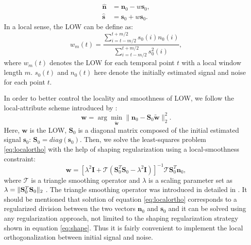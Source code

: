 \begin{align}
\label{eq:ortho1}
\hat{\mathbf{n}} &= \mathbf{n}_0 - w\mathbf{s}_0, \\
\label{eq:ortho2}
\hat{\mathbf{s}} &= \mathbf{s}_0 + w\mathbf{s}_0.
\end{align}
In a local sense, the LOW can be define as:
      \begin{equation}
        \label{eq:eq2}
          w_m(t) = \frac{\displaystyle\sum_{i=t-m/2}^{t+m/2} s_0(i) n_0(i)}{\displaystyle\sum_{i=t-m/2}^{t+m/2} s_0^2(i)},
      \end{equation}
where $w_m(t)$ denotes the LOW for each temporal point $t$ with a local window length $m$. $s_0(t)$ and $n_0(t)$ here denote the initially estimated signal and noise for each point $t$.

In order to better control the locality and smoothness of LOW, we follow the local-attribute scheme introduced by \cite{fomel2007localattr}: %
\begin{equation}
\label{eq:localortho}
\mathbf{w} = \arg\min_{\mathbf{\tilde{w}}} \parallel \mathbf{n}_0 - \mathbf{S}_0\mathbf{\tilde{w}}\parallel_2^2. %
\end{equation}
Here, $\mathbf{w}$ is the LOW, $\mathbf{S}_0$ is a diagonal matrix composed of the initial estimated signal $\mathbf{s}_0$: $\mathbf{S}_0=diag(\mathbf{s}_0)$.
Then, we solve the least-squares problem \ref{eq:localortho} with the help of shaping regularization using a local-smoothness constraint:
\begin{equation}
\label{eq:shape}
\mathbf{w} = [\lambda^2\mathbf{I} + \mathcal{T}(\mathbf{S}_0^T\mathbf{S}_0-\lambda^2\mathbf{I})]^{-1}\mathcal{T}\mathbf{S}_0^T\mathbf{n}_0,
\end{equation}
where $\mathcal{T}$ is a triangle smoothing operator and $\lambda$ is a scaling parameter set as $\lambda  = \Arrowvert\mathbf{S}_0^T\mathbf{S}_0\Arrowvert_2$ \cite{fomel2007localattr}. The triangle smoothing operator was introduced in detailed in \cite{fomel2007shape}. It should be mentioned that solution of equation \ref{eq:localortho} corresponds to a regularized division between the two vectors $\mathbf{n}_0$ and $\mathbf{s}_0$ and it can be solved using any regularization approach, not limited to the shaping regularization strategy shown in equation \ref{eq:shape}. Thus it is fairly convenient to implement the local orthogonalization between initial signal and noise.

